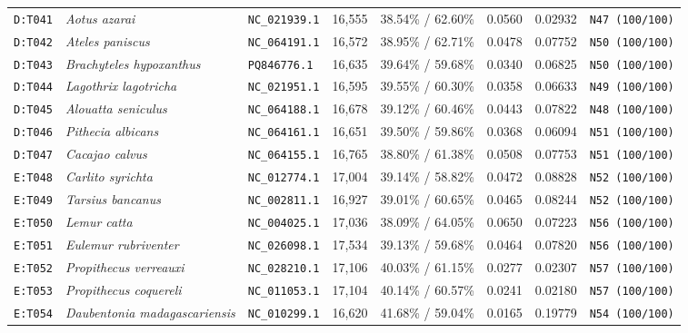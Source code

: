 \documentclass[10pt,letterpaper]{article}
\begin{document}
\begin{longtable}{llllllll}
\texttt{D:T041} & \textit{Aotus azarai} & \texttt{NC\_021939.1} & 16,555 & 38.54\% / 62.60\% & 0.0560 & 0.02932 & \texttt{N47 (100/100)} \\
\texttt{D:T042} & \textit{Ateles paniscus} & \texttt{NC\_064191.1} & 16,572 & 38.95\% / 62.71\% & 0.0478 & 0.07752 & \texttt{N50 (100/100)} \\
\texttt{D:T043} & \textit{Brachyteles hypoxanthus} & \texttt{PQ846776.1} & 16,635 & 39.64\% / 59.68\% & 0.0340 & 0.06825 & \texttt{N50 (100/100)} \\
\texttt{D:T044} & \textit{Lagothrix lagotricha} & \texttt{NC\_021951.1} & 16,595 & 39.55\% / 60.30\% & 0.0358 & 0.06633 & \texttt{N49 (100/100)} \\
\texttt{D:T045} & \textit{Alouatta seniculus} & \texttt{NC\_064188.1} & 16,678 & 39.12\% / 60.46\% & 0.0443 & 0.07822 & \texttt{N48 (100/100)} \\
\texttt{D:T046} & \textit{Pithecia albicans} & \texttt{NC\_064161.1} & 16,651 & 39.50\% / 59.86\% & 0.0368 & 0.06094 & \texttt{N51 (100/100)} \\
\texttt{D:T047} & \textit{Cacajao calvus} & \texttt{NC\_064155.1} & 16,765 & 38.80\% / 61.38\% & 0.0508 & 0.07753 & \texttt{N51 (100/100)} \\
\texttt{E:T048} & \textit{Carlito syrichta} & \texttt{NC\_012774.1} & 17,004 & 39.14\% / 58.82\% & 0.0472 & 0.08828 & \texttt{N52 (100/100)} \\
\texttt{E:T049} & \textit{Tarsius bancanus} & \texttt{NC\_002811.1} & 16,927 & 39.01\% / 60.65\% & 0.0465 & 0.08244 & \texttt{N52 (100/100)} \\
\texttt{E:T050} & \textit{Lemur catta} & \texttt{NC\_004025.1} & 17,036 & 38.09\% / 64.05\% & 0.0650 & 0.07223 & \texttt{N56 (100/100)} \\
\texttt{E:T051} & \textit{Eulemur rubriventer} & \texttt{NC\_026098.1} & 17,534 & 39.13\% / 59.68\% & 0.0464 & 0.07820 & \texttt{N56 (100/100)} \\
\texttt{E:T052} & \textit{Propithecus verreauxi} & \texttt{NC\_028210.1} & 17,106 & 40.03\% / 61.15\% & 0.0277 & 0.02307 & \texttt{N57 (100/100)} \\
\texttt{E:T053} & \textit{Propithecus coquereli} & \texttt{NC\_011053.1} & 17,104 & 40.14\% / 60.57\% & 0.0241 & 0.02180 & \texttt{N57 (100/100)} \\
\texttt{E:T054} & \textit{Daubentonia madagascariensis} & \texttt{NC\_010299.1} & 16,620 & 41.68\% / 59.04\% & 0.0165 & 0.19779 & \texttt{N54 (100/100)} \\

\end{longtable}
\end{document}
